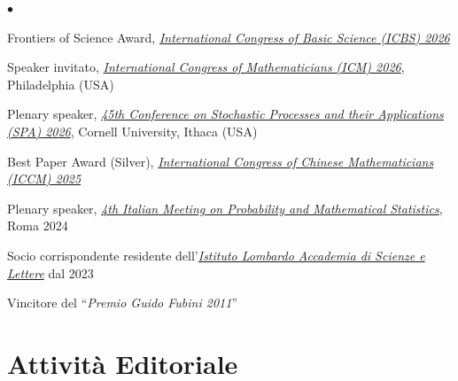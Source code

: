 \documentclass[a4paper,11pt,oneside]{amsart}
\newenvironment{myitemize}{%
\begin{list}{$\bullet$}%
 	{%
	\setlength{\itemsep}{0.3em}%
	\setlength{\topsep}{0.3em}%
	\setlength{\partopsep}{0em}%
	\setlength{\parsep}{0em}%
	\setlength{\parskip}{0em}%
	\setlength\leftmargin{1.5em}%
	\setlength\labelwidth{1.1em}%
	\setlength{\labelsep}{0.4em}%
	}%
	}%
{\end{list}}
\renewenvironment{itemize}{
\begin{myitemize}}%
{\end{myitemize}}
\begin{document}
\begin{itemize}
\item Frontiers of Science Award, 
\href{https://www.icbs.cn/site/?pageId=38be333f-cd8a-4593-ab24-8a15e91b4115}{\emph{International Congress of Basic Science (ICBS) 2026}}


\item Speaker invitato, 
\href{https://www.icm2026.org/event/ac193975-5d24-4628-8c30-ddb23de19a8b/speakers}{\emph{International Congress of Mathematicians (ICM) 2026}},
Philadelphia (USA)


\item Plenary speaker,
\href{https://events.ces.scl.cornell.edu/event/7d2eb9fb-e4e1-4163-ab03-bb8419050b73/summary?tm=c314K3S6DBKCVokeOwfM4-e56vCGWx3RSuAt0fFOZu0}{\emph{45th Conference on Stochastic Processes and their Applications (SPA) 2026}},
Cornell University, Ithaca (USA)

\item Best Paper Award (Silver), 
\href{https://iccm.simis.cn/iccm2025/site/awards/best-paper-award/}{\emph{International Congress of Chinese Mathematicians (ICCM) 2025}}


\item Plenary speaker, \href{https://probabilityrome2024.it/plenary-speakers/}{\emph{4th Italian Meeting on
Probability and Mathematical Statistics}}, Roma 2024

\item Socio corrispondente residente dell'\href{https://istitutolombardo.it/istituzione/accademico/488}{\emph{Istituto Lombardo Accademia di Scienze e Lettere}}
dal 2023

\item Vincitore del ``\emph{Premio Guido Fubini 2011}''
\end{itemize}

\section{Attività Editoriale}
\end{document}
